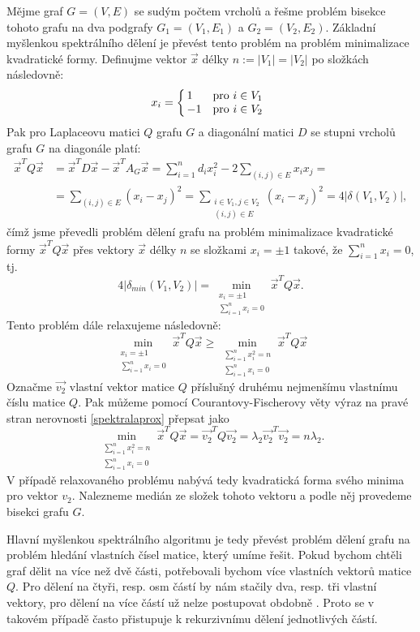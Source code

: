 \documentclass{ctuthesis}
\theoremstyle{plain}
\theoremstyle{definition}
\begin{document}
Mějme graf $G=(V,E)$ se sudým počtem vrcholů a řešme problém bisekce tohoto grafu na dva podgrafy $G_1=(V_1,E_1)$ a $G_2=(V_2,E_2)$. Základní myšlenkou spektrálního dělení je převést tento problém na problém minimalizace kvadratické formy.
Definujme vektor $\vec{x}$ délky $n:=|V_1|=|V_2|$ po složkách následovně:
\[
x_i =
\left\{
	\begin{array}{@{\,}ll}
		1  & \mbox{pro } i \in V_1 \\
		-1 & \mbox{pro } i \in V_2
	\end{array}
\right.
\]
Pak pro Laplaceovu matici $Q$ grafu $G$ a diagonální matici $D$ se stupni vrcholů grafu $G$ na diagonále platí:
\begin{align*}
  \vec{x}^T Q \vec{x} &= \vec{x}^T D \vec{x} - \vec{x}^T A_G \vec{x} = \sum_{i=1}^{n}d_i x_i^2 - 2 \sum_{(i,j)\in E} x_i x_j = \\
&=\sum_{(i,j)\in E}(x_i-x_j)^2 =
\sum\limits_{\substack{i \in V_1, j \in V_2 \\ (i,j)\in E}}(x_i-x_j)^2 =
4|\delta(V_1, V_2)|,
\end{align*}
\noindent
čímž jsme převedli problém dělení grafu na problém minimalizace kvadratické formy $\vec{x}^T Q \vec{x}$ přes vektory $\vec{x}$ délky $n$ se složkami $x_i = \pm 1$ takové, že $\sum_{i=1 }^{n}x_i = 0$, tj.
\[
  4 |\delta_{min}(V_1, V_2)| = \min_{\substack{x_i = \pm 1 \\ \sum_{i=1 }^{n}x_i = 0}} \vec{x}^T Q \vec{x}.
  \]
Tento problém dále relaxujeme následovně:
\begin{equation}\label{spektralaprox}
\min_{\substack{x_i = \pm 1 \\ \sum_{i=1 }^{n}x_i = 0}} \vec{x}^T Q \vec{x} \geq \min_{\substack{\sum_{i=1}^{n}x_i^2 = n \\ \sum_{i=1 }^{n}x_i = 0}} \vec{x}^T Q \vec{x}
\end{equation}
Označme $\vec{v_2}$ vlastní vektor matice $Q$ příslušný druhému nejmenšímu vlastnímu číslu matice $Q$. Pak můžeme pomocí Courantovy-Fischerovy věty \cite{hojo:85} výraz na pravé stran nerovnosti \ref{spektralaprox} přepsat jako
\[
\min_{\substack{\sum_{i=1}^{n}x_i^2 = n \\ \sum_{i=1 }^{n}x_i = 0}} \vec{x}^T Q \vec{x} = \vec{v_2}^T Q \vec{v_2} = \lambda_2 \vec{v_2}^T \vec{v_2} = n \lambda_2.
\]
V případě relaxovaného problému nabývá tedy kvadratická forma svého minima pro vektor $v_2$. Nalezneme medián ze složek tohoto vektoru a podle něj provedeme bisekci grafu $G$.

Hlavní myšlenkou spektrálního algoritmu je tedy převést problém dělení grafu na problém hledání vlastních čísel matice, který umíme řešit. Pokud bychom chtěli graf dělit na více než dvě části, potřebovali bychom více vlastních vektorů matice $Q$. Pro dělení na čtyři, resp. osm částí by nám stačily dva, resp. tři vlastní vektory, pro dělení na více částí už nelze postupovat obdobně \cite{lehe:94}. Proto se v takovém případě často přistupuje k rekurzivnímu dělení jednotlivých částí.
\end{document}
